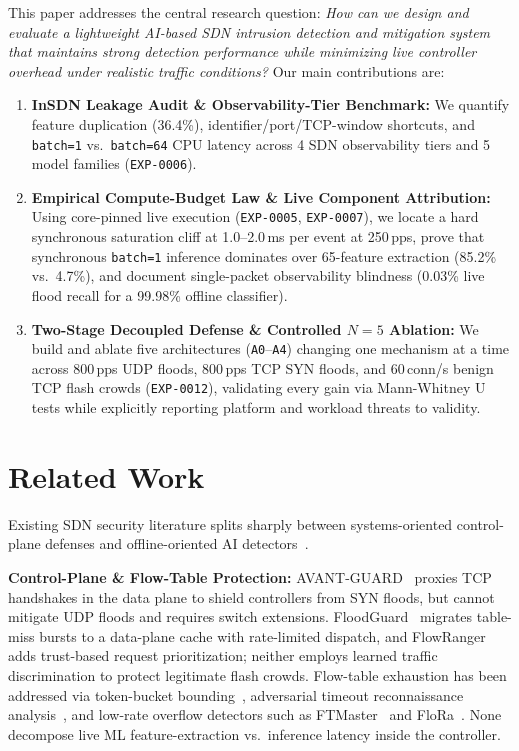 \documentclass[conference]{IEEEtran}
\begin{document}
This paper addresses the central research question: \emph{How can we design and evaluate a lightweight AI-based SDN intrusion detection and mitigation system that maintains strong detection performance while minimizing live controller overhead under realistic traffic conditions?} Our main contributions are:
\begin{enumerate}
    \item \textbf{InSDN Leakage Audit \& Observability-Tier Benchmark:} We quantify feature duplication (36.4\%), identifier/port/TCP-window shortcuts, and \texttt{batch=1} vs.\ \texttt{batch=64} CPU latency across 4 SDN observability tiers and 5 model families (\texttt{EXP-0006}).
    \item \textbf{Empirical Compute-Budget Law \& Live Component Attribution:} Using core-pinned live execution (\texttt{EXP-0005}, \texttt{EXP-0007}), we locate a hard synchronous saturation cliff at 1.0--2.0\,ms per event at 250\,pps, prove that synchronous \texttt{batch=1} inference dominates over 65-feature extraction (85.2\% vs.\ 4.7\%), and document single-packet observability blindness (0.03\% live flood recall for a 99.98\% offline classifier).
    \item \textbf{Two-Stage Decoupled Defense \& Controlled $N=5$ Ablation:} We build and ablate five architectures (\texttt{A0}--\texttt{A4}) changing one mechanism at a time across 800\,pps UDP floods, 800\,pps TCP SYN floods, and 60\,conn/s benign TCP flash crowds (\texttt{EXP-0012}), validating every gain via Mann-Whitney U tests while explicitly reporting platform and workload threats to validity.
\end{enumerate}

\section{Related Work}
Existing SDN security literature splits sharply between systems-oriented control-plane defenses and offline-oriented AI detectors~\cite{janabi2024survey}.

\textbf{Control-Plane \& Flow-Table Protection:} AVANT-GUARD~\cite{shin2013avantguard} proxies TCP handshakes in the data plane to shield controllers from SYN floods, but cannot mitigate UDP floods and requires switch extensions. FloodGuard~\cite{wang2015floodguard} migrates table-miss bursts to a data-plane cache with rate-limited dispatch, and FlowRanger~\cite{wei2015flowranger} adds trust-based request prioritization; neither employs learned traffic discrimination to protect legitimate flash crowds. Flow-table exhaustion has been addressed via token-bucket bounding~\cite{xu2017tableoverflow}, adversarial timeout reconnaissance analysis~\cite{yu2021flowtable}, and low-rate overflow detectors such as FTMaster~\cite{tang2023ftmaster} and FloRa~\cite{mudgal2024flora}. None decompose live ML feature-extraction vs.\ inference latency inside the controller.
\end{document}
